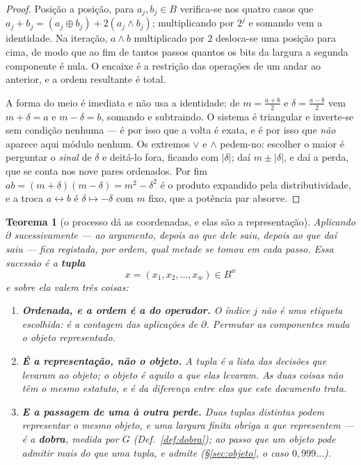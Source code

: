\documentclass[11pt,a4paper]{article}
\newtheorem{teorema}{Teorema}
\begin{document}
\begin{proof}
Posição a posição, para $a_j,b_j\in B$ verifica-se nos quatro casos que
$a_j+b_j=(a_j\oplus b_j)+2(a_j\wedge b_j)$; multiplicando por $2^{j}$ e somando
vem a identidade. Na iteração, $a\wedge b$ multiplicado por $2$ desloca-se uma
posição para cima, de modo que ao fim de tantos passos quantos os bits da
largura a segunda componente é nula. O encaixe é a restrição das operações de um
andar ao anterior, e a ordem resultante é total.

A forma do meio é imediata e não usa a identidade: de $m=\tfrac{a+b}{2}$ e
$\delta=\tfrac{a-b}{2}$ vem $m+\delta=a$ e $m-\delta=b$, somando e subtraindo. O
sistema é triangular e inverte-se sem condição nenhuma --- é por isso que a
volta é exata, e é por isso que \emph{não} aparece aqui módulo nenhum. Os
extremos $\vee$ e $\wedge$ pedem-no: escolher o maior é perguntar o \emph{sinal}
de $\delta$ e deitá-lo fora, ficando com $|\delta|$; daí $m\pm|\delta|$, e daí a
perda, que se conta nos nove pares ordenados. Por fim
$ab=(m+\delta)(m-\delta)=m^{2}-\delta^{2}$ é o produto expandido pela
distributividade, e a troca $a\leftrightarrow b$ é $\delta\mapsto-\delta$ com
$m$ fixo, que a potência par absorve.
\end{proof}

\begin{teorema}[o processo dá as coordenadas, e elas são a representação]\label{thm:coord}
Aplicando $\partial$ sucessivamente --- ao argumento, depois ao que dele saiu,
depois ao que daí saiu --- fica registada, por ordem, qual metade se tomou em
cada passo. Essa sucessão é a \textbf{tupla}
\[
\boxed{\;x=(x_1,x_2,\dots,x_w)\in B^{w}\;}
\]
e sobre ela valem três coisas:
\begin{enumerate}\itemsep3pt
\item[(1)] \textbf{Ordenada, e a ordem é a do operador.} O índice $j$ não é uma
etiqueta escolhida: é a \emph{contagem das aplicações} de $\partial$. Permutar
as componentes muda o objeto representado.
\item[(2)] \textbf{É a representação, não o objeto.} A tupla é a lista das
decisões que levaram ao objeto; o objeto é aquilo a que elas levaram. As duas
coisas não têm o mesmo estatuto, e é da diferença entre elas que este documento
trata.
\item[(3)] \textbf{E a passagem de uma à outra perde.} Duas tuplas distintas
podem representar o mesmo objeto, e uma largura finita obriga a que representem
--- é a \textbf{dobra}, medida por $G$ (Def.~\ref{def:dobra}); ao passo que um
objeto pode admitir mais do que uma tupla, e admite (§\ref{sec:objeto}, o caso
$0{,}999\ldots$).
\end{enumerate}
\end{teorema}
\end{document}
